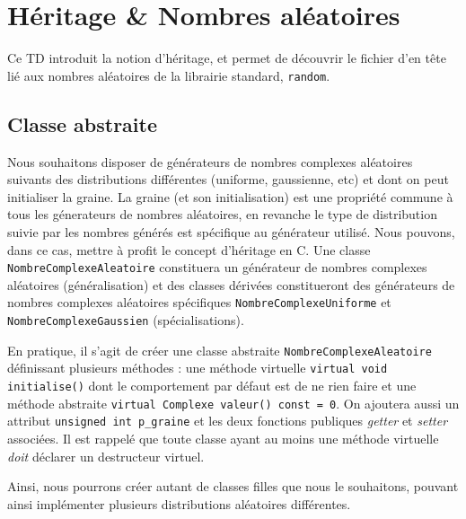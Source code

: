 \documentclass{book}
\newcommand{\inline}[1]{\texttt{#1}}
\newcommand{\cpp}{\mbox{C\vspace{.5em}\protect\raisebox{.2ex}{\footnotesize++~}}}
\begin{document}
  \setcounter{chapter}{4}
\chapter{Héritage \& Nombres aléatoires}

Ce TD introduit la notion d'héritage, et permet de découvrir le fichier d'en tête lié aux nombres aléatoires de la librairie standard, \inline{random}. 

\section{Classe abstraite}

Nous souhaitons disposer de générateurs de nombres complexes aléatoires suivants des distributions différentes (uniforme, gaussienne, etc) et dont on peut initialiser la graine. La graine (et son initialisation) est une propriété commune à tous les génerateurs de nombres aléatoires, en revanche le type de distribution suivie par les nombres générés est spécifique au générateur utilisé. Nous pouvons, dans ce cas, mettre à profit le concept d'héritage en \cpp. Une classe \inline{NombreComplexeAleatoire} constituera un générateur de nombres complexes aléatoires (généralisation) et des classes dérivées constitueront des générateurs de nombres complexes aléatoires spécifiques \inline{NombreComplexeUniforme} et \inline{NombreComplexeGaussien} (spécialisations).

En pratique, il s'agit de créer une classe abstraite \inline{NombreComplexeAleatoire} définissant plusieurs méthodes : une méthode virtuelle \inline{virtual void initialise()} dont le comportement par défaut est de ne rien faire et une méthode abstraite \inline{virtual Complexe valeur() const = 0}. On ajoutera aussi un attribut \inline{unsigned int p_graine} et les deux fonctions publiques \emph{getter} et \emph{setter} associées. Il est rappelé que toute classe ayant au moins une méthode virtuelle \emph{doit} déclarer un destructeur virtuel.

Ainsi, nous pourrons créer autant de classes filles que nous le souhaitons, pouvant ainsi implémenter plusieurs distributions aléatoires différentes.
\end{document}
